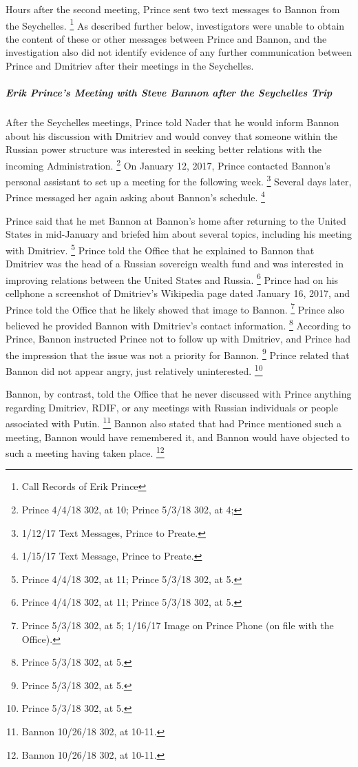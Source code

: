 Hours after the second meeting, Prince sent two text messages to Bannon from the Seychelles.%
\footnote{Call Records of Erik Prince }
As described further below, investigators were unable to obtain the content of these or other messages between Prince and Bannon, and the investigation also did not identify evidence of any further communication between Prince and Dmitriev after their meetings in the Seychelles.

\subparagraph{Erik Prince's Meeting with Steve Bannon after the Seychelles Trip}

After the Seychelles meetings, Prince told Nader that he would inform Bannon about his discussion with Dmitriev and would convey that someone within the Russian power structure was interested in seeking better relations with the incoming Administration.%
\footnote{Prince 4/4/18 302, at 10;
Prince 5/3/18 302, at 4;
}
On January 12, 2017, Prince contacted Bannon's personal assistant to set up a meeting for the following week.%
\footnote{1/12/17 Text Messages, Prince to Preate.}
Several days later, Prince messaged her again asking about Bannon's schedule.%
\footnote{1/15/17 Text Message, Prince to Preate.}

Prince said that he met Bannon at Bannon's home after returning to the United States in mid-January and briefed him about several topics, including his meeting with Dmitriev.%
\footnote{Prince 4/4/18 302, at 11;
Prince 5/3/18 302, at 5.}
Prince told the Office that he explained to Bannon that Dmitriev was the head of a Russian sovereign wealth fund and was interested in improving relations between the United States and Russia.%
\footnote{Prince 4/4/18 302, at 11;
Prince 5/3/18 302, at 5.}
Prince had on his cellphone a screenshot of Dmitriev's Wikipedia page dated January 16, 2017, and Prince told the Office that he likely showed that image to Bannon.%
\footnote{Prince 5/3/18 302, at 5;
1/16/17 Image on Prince Phone (on file with the Office).}
Prince also believed he provided Bannon with Dmitriev's contact information.%
\footnote{Prince 5/3/18 302, at 5.}
According to Prince, Bannon instructed Prince not to follow up with Dmitriev, and Prince had the impression that the issue was not a priority for Bannon.%
\footnote{Prince 5/3/18 302, at 5.}
Prince related that Bannon did not appear angry, just relatively uninterested.%
\footnote{Prince 5/3/18 302, at 5.}

Bannon, by contrast, told the Office that he never discussed with Prince anything regarding Dmitriev, RDIF, or any meetings with Russian individuals or people associated with Putin.%
\footnote{Bannon 10/26/18 302, at 10-11.}
Bannon also stated that had Prince mentioned such a meeting, Bannon would have remembered it, and Bannon would have objected to such a meeting having taken place.%
\footnote{Bannon 10/26/18 302, at 10-11.}

